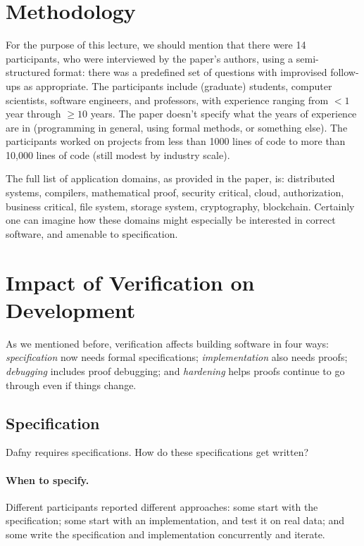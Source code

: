 \documentclass[11pt]{article}
\begin{document}
\section*{Methodology}
For the purpose of this lecture, we should mention that there were 14 participants, who were interviewed by
the paper's authors, using a semi-structured format: there was a predefined set of questions with improvised follow-ups
as appropriate. The participants include (graduate) students, computer scientists, software engineers, and professors,
with experience ranging from $< 1$ year through $\ge 10$ years. The paper doesn't specify what the years of experience
are in (programming in general, using formal methods, or something else). The participants worked on projects
from less than 1000 lines of code to more than 10,000 lines of code (still modest by industry scale).

The full list of application domains, as provided in
the paper, is: distributed systems, compilers, mathematical proof,
security critical, cloud, authorization, business critical, file
system, storage system, cryptography, blockchain. Certainly one can
imagine how these domains might especially be interested in correct
software, and amenable to specification.

\section*{Impact of Verification on Development}
As we mentioned before, verification affects building software in four ways: \emph{specification} now needs formal
specifications; \emph{implementation} also needs proofs; \emph{debugging} includes proof debugging; and \emph{hardening}
helps proofs continue to go through even if things change.

\subsection*{Specification}
Dafny requires specifications. How do these specifications get written?

\paragraph{When to specify.} Different participants reported different approaches: some start with the
specification; some start with an implementation, and test it on real data; and some write the specification
and implementation concurrently and iterate.
\end{document}
